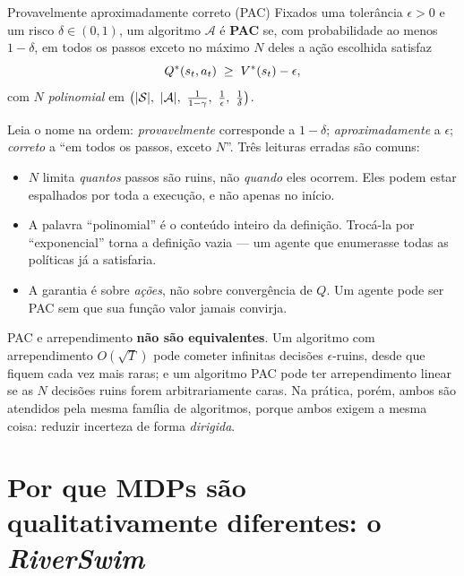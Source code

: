 \documentclass[11pt, a4paper]{article}
\newcommand{\Qstar}{Q^{*}}
\begin{document}
\begin{defbox}{Provavelmente aproximadamente correto (PAC)}
Fixados uma tolerância $\epsilon > 0$ e um risco $\delta \in (0,1)$, um algoritmo
$\mathcal{A}$ é \textbf{PAC} se, com probabilidade ao menos $1-\delta$, em todos os
passos exceto no máximo $N$ deles a ação escolhida satisfaz
\[
  \Qstar(s_t, a_t) \;\ge\; \Vstar(s_t) - \epsilon,
\]
com $N$ \emph{polinomial} em $\bigl(\abs{\gS},\ \abs{\gA},\ \tfrac{1}{1-\gamma},\
\tfrac{1}{\epsilon},\ \tfrac{1}{\delta}\bigr)$.
\end{defbox}

Leia o nome na ordem: \emph{provavelmente} corresponde a $1-\delta$; \emph{aproximadamente}
a $\epsilon$; \emph{correto} a ``em todos os passos, exceto $N$''. Três leituras erradas
são comuns:

\begin{itemize}
  \item $N$ limita \emph{quantos} passos são ruins, não \emph{quando} eles ocorrem. Eles
        podem estar espalhados por toda a execução, e não apenas no início.
  \item A palavra ``polinomial'' é o conteúdo inteiro da definição. Trocá-la por
        ``exponencial'' torna a definição vazia --- um agente que enumerasse todas as
        políticas já a satisfaria.
  \item A garantia é sobre \emph{ações}, não sobre convergência de $Q$. Um agente pode
        ser PAC sem que sua função valor jamais convirja.
\end{itemize}

\begin{alertabox}
PAC e arrependimento \textbf{não são equivalentes}. Um algoritmo com arrependimento
$O(\sqrt{T})$ pode cometer infinitas decisões $\epsilon$-ruins, desde que fiquem cada vez
mais raras; e um algoritmo PAC pode ter arrependimento linear se as $N$ decisões ruins
forem arbitrariamente caras. Na prática, porém, ambos são atendidos pela mesma família de
algoritmos, porque ambos exigem a mesma coisa: reduzir incerteza de forma \emph{dirigida}.
\end{alertabox}

\section{Por que MDPs são qualitativamente diferentes: o \textit{RiverSwim}}
\end{document}
